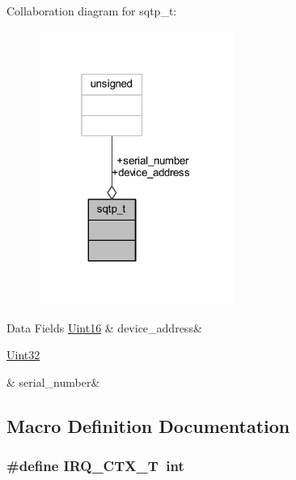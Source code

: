 Collaboration diagram for sqtp\+\_\+t\+:\nopagebreak
\begin{figure}[H]
\begin{center}
\leavevmode
\includegraphics[width=181pt]{d3/d29/a00947}
\end{center}
\end{figure}
\begin{DoxyFields}{Data Fields}
\hypertarget{a00033_a4ad37aef4f33d79d64179f326666ef07}{\hyperlink{a00072_a59a9f6be4562c327cbfb4f7e8e18f08b}{Uint16}}\label{a00033_a4ad37aef4f33d79d64179f326666ef07}
&
device\+\_\+address&
\\
\hline

\hypertarget{a00033_a728c5fe7bc16e168a8f93fba18ee5561}{\hyperlink{a00072_aba99025e657f892beb7ff31cecf64653}{Uint32}}\label{a00033_a728c5fe7bc16e168a8f93fba18ee5561}
&
serial\+\_\+number&
\\
\hline

\end{DoxyFields}


\subsection{Macro Definition Documentation}
\hypertarget{a00033_a6d4f0a7397640f5b011ca9c39d47dc72}{
\subsubsection[{I\+R\+Q\+\_\+\+C\+T\+X\+\_\+\+T}]{\setlength{\rightskip}{0pt plus 5cm}\#define I\+R\+Q\+\_\+\+C\+T\+X\+\_\+\+T~int}}\label{a00033_a6d4f0a7397640f5b011ca9c39d47dc72}


